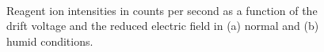 \begin{figure}[htbp]
\centering
{}\\
\caption{Reagent ion intensities in counts per second as a function of the drift voltage and the reduced electric field in (a) normal and (b) humid conditions.}
\label{fig:RI_coc}
\end{figure}

